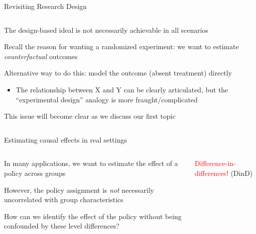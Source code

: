 \documentclass[notes,11pt, aspectratio=169]{beamer}
\newenvironment{wideitemize}{\itemize\addtolength{\itemsep}{10pt}}{\enditemize}
\begin{document}
\begin{frame}{Revisiting Research Design}
  \begin{columns}[T] %
    \begin{column}{0.7\textwidth}
      \begin{wideitemize}
      \item The design-based ideal is not necessarily achievable in all scenarios
      \item Recall the reason for wanting a randomized experiment: we want to estimate \emph{counterfactual} outcomes
      \item Alternative way to do this: model the outcome (absent treatment) directly
        \begin{itemize}
        \item The relationship between X and Y can be clearly
          articulated, but the ``experimental design'' analogy is more fraught/complicated
        \end{itemize}
      \item This issue will become clear as we discuss our first topic
      \end{wideitemize}
    \end{column}%
    \hfill%
    \begin{column}{.7\textwidth}

    \end{column}%
  \end{columns}
\end{frame}


\begin{frame}{Estimating causal effects in real settings}
  \begin{columns}[T] %
    \begin{column}{.58\textwidth}
      \begin{wideitemize}
      \item In many applications, we want to estimate the effect of a policy across groups
      \item However, the policy assignment is  \emph{not} necessarily uncorrelated with group characteristics
      \item How can we identify the effect of the policy without being confounded by these level differences?
      \end{wideitemize}
    \end{column}%
    \hfill%
    \begin{column}{.38\textwidth}
      {
        \vspace{30pt}
      \begin{center}
        \Large \textcolor{red}{Difference-in-differences!}
        \normalsize (DinD)
        \end{center}
        }
    \end{column}%
  \end{columns}
\end{frame}
\end{document}
